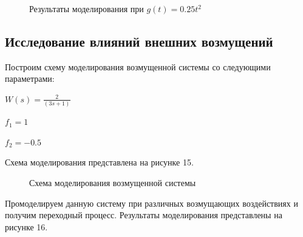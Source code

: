 \documentclass[a4paper, 11pt]{article}
\begin{document}
\begin{figure}[h!]
\centering
{}
\caption{Результаты моделирования при $g(t)=0.25t^2$}
\end{figure}

\newpage
\begin{center}
\section{Исследование влияний внешних возмущений}
\end{center}
\par 
Построим схему моделирования возмущенной системы со следующими параметрами:
\par 
$W(s)=\displaystyle\frac{2}{(3s+1)}$
\par 
$f_1=1$
\par 
$f_2=-0.5$
\par 
Схема моделирования представлена на рисунке 15. 

\begin{figure}[h!]
\caption{Схема моделирования возмущенной системы}
\label{ris:image}
\end{figure}

\par 
Промоделируем данную систему при различных возмущающих воздействиях и получим переходный процесс. Результаты моделирования представлены на рисунке 16.
	
\end{document}
